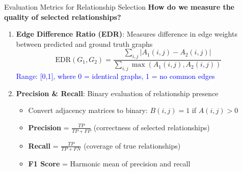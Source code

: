 \documentclass[aspectratio=169]{beamer}
\begin{document}
\begin{frame}{Evaluation Metrics for Relationship Selection}
    \textbf{How do we measure the quality of selected relationships?}

    \vspace{0.5em}

    \begin{enumerate}
        \item \textbf{Edge Difference Ratio (EDR)}: Measures difference in edge weights between predicted and ground truth graphs
              \begin{equation}
                  \text{EDR}(G_1, G_2) = \frac{\sum_{i,j} |A_1(i,j) - A_2(i,j)|}{\sum_{i,j} \max(A_1(i,j), A_2(i,j))}
              \end{equation}
              \textcolor{blue}{Range: [0,1], where 0 = identical graphs, 1 = no common edges}

        \item \textbf{Precision \& Recall}: Binary evaluation of relationship presence
              \begin{itemize}
                  \item Convert adjacency matrices to binary: $B(i,j) = 1$ if $A(i,j) > 0$
                  \item \textbf{Precision} = $\frac{TP}{TP + FP}$ (correctness of selected relationships)
                  \item \textbf{Recall} = $\frac{TP}{TP + FN}$ (coverage of true relationships)
                  \item \textbf{F1 Score} = Harmonic mean of precision and recall
              \end{itemize}
    \end{enumerate}
\end{frame}
\end{document}
